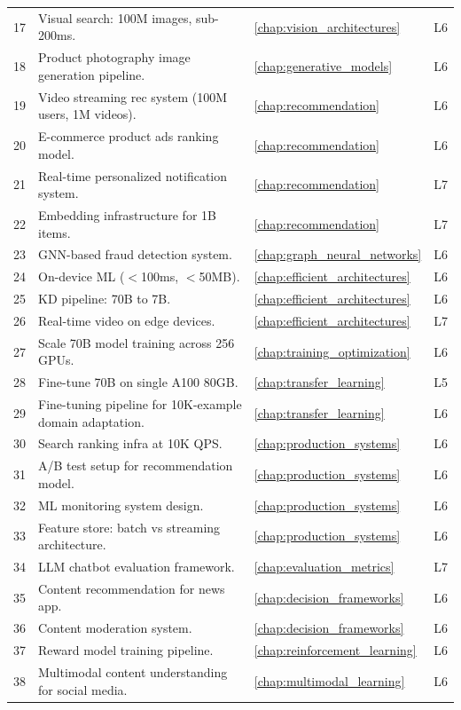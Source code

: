 \begin{longtable}{rp{8.5cm}ll}
17 & Visual search: 100M images, sub-200ms. & \ref{chap:vision_architectures} & L6 \\
18 & Product photography image generation pipeline. & \ref{chap:generative_models} & L6 \\
19 & Video streaming rec system (100M users, 1M videos). & \ref{chap:recommendation} & L6 \\
20 & E-commerce product ads ranking model. & \ref{chap:recommendation} & L6 \\
21 & Real-time personalized notification system. & \ref{chap:recommendation} & L7 \\
22 & Embedding infrastructure for 1B items. & \ref{chap:recommendation} & L7 \\
23 & GNN-based fraud detection system. & \ref{chap:graph_neural_networks} & L6 \\
24 & On-device ML ($<$100ms, $<$50MB). & \ref{chap:efficient_architectures} & L6 \\
25 & KD pipeline: 70B to 7B. & \ref{chap:efficient_architectures} & L6 \\
26 & Real-time video on edge devices. & \ref{chap:efficient_architectures} & L7 \\
27 & Scale 70B model training across 256 GPUs. & \ref{chap:training_optimization} & L6 \\
28 & Fine-tune 70B on single A100 80GB. & \ref{chap:transfer_learning} & L5 \\
29 & Fine-tuning pipeline for 10K-example domain adaptation. & \ref{chap:transfer_learning} & L6 \\
30 & Search ranking infra at 10K QPS. & \ref{chap:production_systems} & L6 \\
31 & A/B test setup for recommendation model. & \ref{chap:production_systems} & L6 \\
32 & ML monitoring system design. & \ref{chap:production_systems} & L6 \\
33 & Feature store: batch vs streaming architecture. & \ref{chap:production_systems} & L6 \\
34 & LLM chatbot evaluation framework. & \ref{chap:evaluation_metrics} & L7 \\
35 & Content recommendation for news app. & \ref{chap:decision_frameworks} & L6 \\
36 & Content moderation system. & \ref{chap:decision_frameworks} & L6 \\
37 & Reward model training pipeline. & \ref{chap:reinforcement_learning} & L6 \\
38 & Multimodal content understanding for social media. & \ref{chap:multimodal_learning} & L6 \\

\end{longtable}
